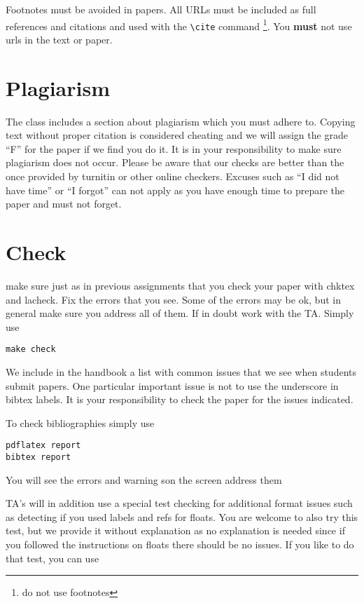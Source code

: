 Footnotes must be avoided in papers. All URLs must be included as full
references and citations and used with the \verb|\cite| command
\footnote{do not use footnotes}. You {\bf must} not use urls in the
text or paper.

\section{Plagiarism}

The class includes a section about plagiarism which you must adhere
to. Copying text without proper citation is considered cheating and we
will assign the grade ``F'' for the paper if we find you do it. It is
in your responsibility to make sure plagiarism does not occur. Please
be aware that our checks are better than the once provided by turnitin
or other online checkers. Excuses such as ``I did not have time'' or
``I forgot'' can not apply as you have enough time to prepare the
paper and must not forget. 

\section{Check}

make sure just as in previous assignments that you check your paper
with chktex and lacheck. Fix the errors that you see. Some of the
errors may be ok, but in general make sure you address all of them. If
in doubt work with the TA. Simply use

\begin{verbatim}
make check
\end{verbatim}

We include in the handbook a list with common issues that we see when
students submit papers. One particular important issue is not to use
the underscore in bibtex labels. It is your responsibility to check
the paper for the issues indicated.

To check bibliographies simply use

\begin{verbatim}
pdflatex report
bibtex report
\end{verbatim}

You will see the errors and warning son the screen address them

TA's will in addition use a special test checking for additional
format issues such as detecting if you used labels and refs for
floats. You are welcome to also try this test, but we provide it
without explanation as no explanation is needed since if you followed
the instructions on floats there should be no issues. If you like to
do that test, you can use  

